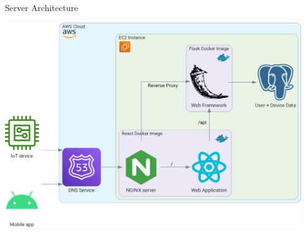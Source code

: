 \documentclass[final]{beamer}
\newlength{\sepwidth}
\newlength{\colwidth}
\newcommand{\separatorcolumn}{\begin{column}{\sepwidth}\end{column}}
\begin{document}
\begin{frame}[t]
\begin{columns}[t]
\begin{column}{\colwidth}
\begin{block}{Server Architecture}
        \vskip 0.5cm
        \begin{center}
          \includegraphics[width = 0.95 \textwidth]{data_flow.png}
        \end{center}
      \end{block}

    \end{column}
  \separatorcolumn

  \end{columns}


\end{frame}
\end{document}

